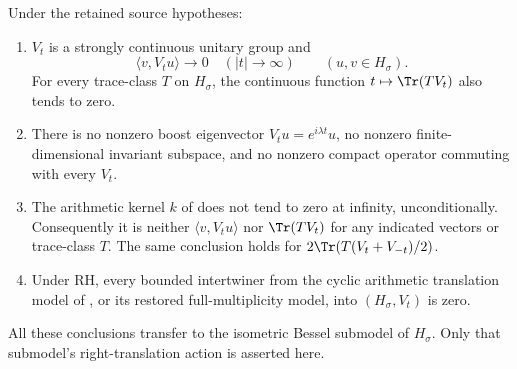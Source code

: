 \begin{proposition}
Under the retained source hypotheses:
\begin{enumerate}
\item \(V_t\) is a strongly continuous unitary group and
\[
 \langle v,V_tu\rangle\longrightarrow0
 \quad(|t|\longrightarrow\infty)
 \qquad(u,v\in H_\sigma).
\]
For every trace-class \(T\) on \(H_\sigma\), the continuous
function \(t\mapsto\Tr(TV_t)\) also tends to zero.
\item There is no nonzero boost eigenvector
\(V_tu=e^{i\lambda t}u\), no nonzero finite-dimensional invariant
subspace, and no nonzero compact operator commuting with every
\(V_t\).
\item The arithmetic kernel \(k\) of  does not tend
to zero at infinity, unconditionally. Consequently it is neither
\(\langle v,V_tu\rangle\) nor \(\Tr(TV_t)\) for any indicated
vectors or trace-class \(T\). The same conclusion holds for
\(2\Tr(T(V_t+V_{-t})/2)\).
\item Under RH, every bounded intertwiner from the cyclic
arithmetic translation model of , or its restored
full-multiplicity model, into \((H_\sigma,V_t)\) is zero.
\end{enumerate}
All these conclusions transfer to the isometric Bessel submodel
of \(H_\sigma\). Only that submodel's right-translation action
is asserted here.
\end{proposition}
